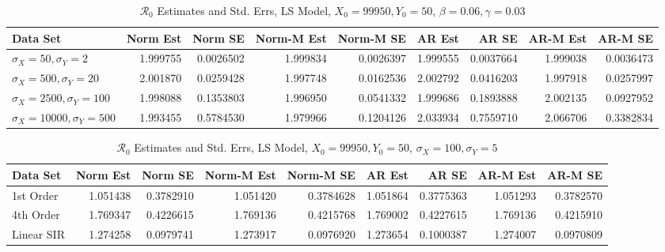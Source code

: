 \documentclass[12pt]{article}
\newcommand{\rr}{\ensuremath{\mathcal{R}_0}}
\begin{document}
\begin{table}[H]
	\caption{\label{tab:}$\rr$ Estimates and Std. Errs, LS Model,
		$X_0 = 99950, Y_0 = 50$, $\beta = 0.06, \gamma = 0.03$}
	\centering
	\begin{footnotesize}
		\begin{tabular}[t]{l|r|r|r|r|r|r|r|r}
			\hline
			Data Set & Norm Est & Norm SE & Norm-M Est & Norm-M SE & AR Est & AR SE & AR-M Est & AR-M SE\\
			\hline
			$\sigma_X = 50, \sigma_Y = 2$ & 1.999755 & 0.0026502 & 1.999834 & 0.0026397 & 1.999555 & 0.0037664 & 1.999038 & 0.0036473\\
			\hline
			$\sigma_X = 500, \sigma_Y = 20$ & 2.001870 & 0.0259428 & 1.997748 & 0.0162536 & 2.002792 & 0.0416203 & 1.997918 & 0.0257997\\
			\hline
			$\sigma_X = 2500, \sigma_Y = 100$ & 1.998088 & 0.1353803 & 1.996950 & 0.0541332 & 1.999686 & 0.1893888 & 2.002135 & 0.0927952\\
			\hline
			$\sigma_X = 10000, \sigma_Y = 500$ & 1.993455 & 0.5784530 & 1.979966 & 0.1204126 & 2.033934 & 0.7559710 & 2.066706 & 0.3382834\\
			\hline
		\end{tabular}
	\end{footnotesize}
\end{table}

\begin{table}[H]
	
	\caption{\label{tab:}$\rr$ Estimates and Std. Errs, LS Model,
		$X_0 = 99950, Y_0 = 50$, $\sigma_X = 100, \sigma_Y = 5$}
	\centering
	\begin{footnotesize}
		\begin{tabular}[t]{l|r|r|r|r|r|r|r|r}
			\hline
			Data Set & Norm Est & Norm SE & Norm-M Est & Norm-M SE & AR Est & AR SE & AR-M Est & AR-M SE\\
			\hline
			1st Order & 1.051438 & 0.3782910 & 1.051420 & 0.3784628 & 1.051864 & 0.3775363 & 1.051293 & 0.3782570\\
			\hline
			4th Order & 1.769347 & 0.4226615 & 1.769136 & 0.4215768 & 1.769002 & 0.4227615 & 1.769136 & 0.4215910\\
			\hline
			Linear SIR & 1.274258 & 0.0979741 & 1.273917 & 0.0976920 & 1.273654 & 0.1000387 & 1.274007 & 0.0970809\\
			\hline
		\end{tabular}
	\end{footnotesize}
\end{table}
\end{document}

